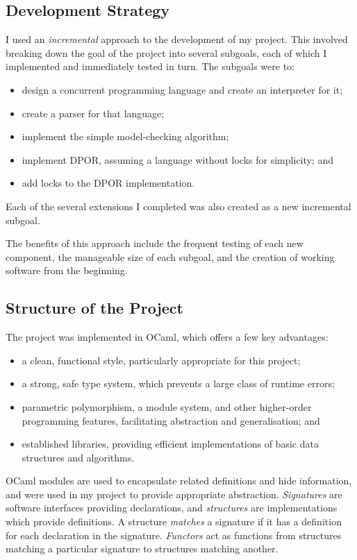 \documentclass[12pt,a4paper,twoside,openright]{report}
\begin{document}
\subsection{Development Strategy}
I used an
\textit{incremental} approach to the
development of my project.
This involved breaking down the
goal of the project into several
subgoals, each of which I implemented
and immediately tested in turn. The subgoals were
to:
\begin{itemize}
	\item design a concurrent programming
	language and create an interpreter for it;
	\item create a parser for that language;
	\item implement the simple model-checking
	algorithm;
	\item implement DPOR, assuming
	a language without locks for simplicity; and
	\item add locks to the DPOR implementation.
\end{itemize}
Each of the several extensions I completed
was also created as a new incremental subgoal.

The benefits of this approach include the frequent
testing of each new component, the manageable
size of each subgoal, and the creation of
working software from the beginning.

\subsection{Structure of the Project}
The project was implemented in OCaml, which
offers a few key advantages:
\begin{itemize}
	\item a clean, functional
	style, particularly appropriate for
	this project;
	\item a strong, safe type system, which prevents
	a large class of runtime errors;
	\item parametric polymorphism, a module system,
	and other higher-order programming features,
	facilitating abstraction and generalisation; and
	\item established libraries, providing efficient
	implementations of basic data structures and algorithms.
\end{itemize}

OCaml modules
are used to encapsulate related definitions and hide
information, and were used in my project to provide
appropriate abstraction.
\emph{Signatures} are software interfaces
providing declarations,
and \emph{structures} are implementations which 
provide definitions. A structure \emph{matches} a
signature if it has a definition for each declaration
in the signature. \emph{Functors} act as
functions from structures matching a
particular signature to structures matching another.
\end{document}
